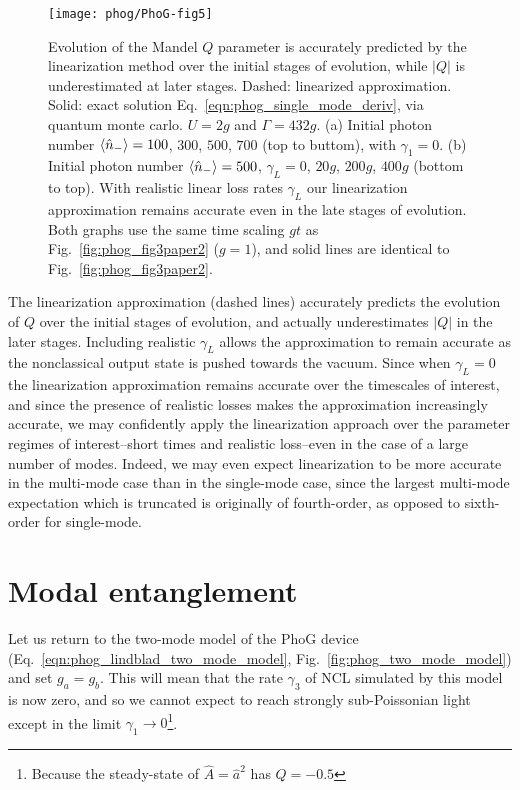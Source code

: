 \begin{figure}[htp]
\centering
\texttt{[image: phog/PhoG-fig5]}
\caption{\label{fig:phog_single_mode_linearization} Evolution of the Mandel $Q$ parameter is accurately predicted by the linearization method over the initial stages of evolution, while $\left|Q\right|$ is underestimated at later stages. Dashed: linearized approximation. Solid: exact solution Eq.~\ref{eqn:phog_single_mode_deriv}, via quantum monte carlo. $U = 2g$ and $\Gamma = 432g$. (a) Initial photon number $\ev{\hat{n}_-} = 100$, $300$, $500$, $700$ (top to buttom), with $\gamma_1 = 0$. (b) Initial photon number $\ev{\hat{n}_-}=500$, $\gamma_L = 0$, $20g$, $200g$, $400g$ (bottom to top). With realistic linear loss rates $\gamma_L$ our linearization approximation remains accurate even in the late stages of evolution. Both graphs use the same time scaling $g t$ as Fig.~\ref{fig:phog_fig3paper2} ($g=1$), and solid lines are identical to Fig.~\ref{fig:phog_fig3paper2}.}
\end{figure}

The linearization approximation (dashed lines) accurately predicts the evolution of $Q$ over the initial stages of evolution, and actually underestimates $\left|Q\right|$ in the later stages. Including realistic $\gamma_L$ allows the approximation to remain accurate as the nonclassical output state is pushed towards the vacuum. Since when $\gamma_L = 0$ the linearization approximation remains accurate over the timescales of interest, and since the presence of realistic losses makes the approximation increasingly accurate, we may confidently apply the linearization approach over the parameter regimes of interest--short times and realistic loss--even in the case of a large number of modes. Indeed, we may even expect linearization to be more accurate in the multi-mode case than in the single-mode case, since the largest multi-mode expectation which is truncated is originally of fourth-order, as opposed to sixth-order for single-mode.



\section{Modal entanglement}\label{sec:phog_entanglement}
Let us return to the two-mode model of the PhoG device (Eq.~\ref{eqn:phog_lindblad_two_mode_model}, Fig.~\ref{fig:phog_two_mode_model}) and set $g_a = g_b$. This will mean that the rate $\gamma_3$ of NCL simulated by this model is now zero, and so we cannot expect to reach strongly sub-Poissonian light except in the limit $\gamma_1 \rightarrow 0$\footnote{Because the steady-state of $\hat{A} = \hat{a}^2$ has $Q = -0.5$}.

